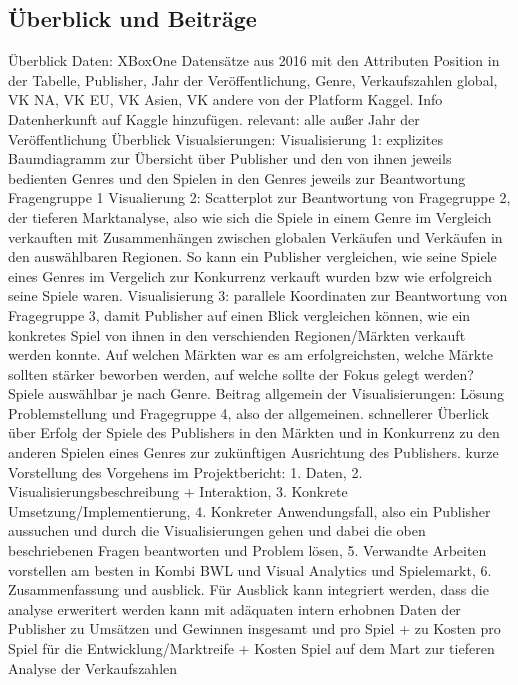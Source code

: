 \documentclass[usegeometry=true]{scrartcl}
\begin{document}
\subsection{Überblick und Beiträge}
Überblick Daten: XBoxOne Datensätze aus 2016 mit den Attributen Position in der Tabelle, Publisher, Jahr der Veröffentlichung, Genre, Verkaufszahlen global, VK NA, VK EU, VK Asien, VK andere von der Platform Kaggel. Info Datenherkunft auf Kaggle hinzufügen. relevant: alle außer Jahr der Veröffentlichung
Überblick Visualsierungen:  
Visualisierung 1: explizites Baumdiagramm zur Übersicht über Publisher und den von ihnen jeweils bedienten Genres und den Spielen in den Genres jeweils zur Beantwortung Fragengruppe 1
Visualierung 2: Scatterplot zur Beantwortung von Fragegruppe 2, der tieferen Marktanalyse, also wie sich die Spiele in einem Genre im Vergleich verkauften mit Zusammenhängen zwischen globalen Verkäufen und Verkäufen in den auswählbaren Regionen. So kann ein Publisher vergleichen, wie seine Spiele eines Genres im Vergelich zur Konkurrenz verkauft wurden bzw wie erfolgreich seine Spiele waren.
Visualisierung 3: parallele Koordinaten zur Beantwortung von Fragegruppe 3, damit Publisher auf einen Blick vergleichen können, wie ein konkretes Spiel von ihnen in den verschienden Regionen/Märkten verkauft werden konnte. Auf welchen Märkten war es am erfolgreichsten, welche Märkte sollten stärker beworben werden, auf welche sollte der Fokus gelegt werden? Spiele auswählbar je nach Genre.
Beitrag allgemein der Visualisierungen: Lösung Problemstellung und Fragegruppe 4, also der allgemeinen. schnellerer Überlick über Erfolg der Spiele des Publishers in den Märkten und in Konkurrenz zu den anderen Spielen eines Genres zur zukünftigen Ausrichtung des Publishers.
kurze Vorstellung des Vorgehens im Projektbericht: 1. Daten, 2. Visualisierungsbeschreibung + Interaktion, 3. Konkrete Umsetzung/Implementierung, 4. Konkreter Anwendungsfall, also ein Publisher aussuchen und durch die Visualisierungen gehen und dabei die oben beschriebenen Fragen beantworten und Problem lösen, 5. Verwandte Arbeiten vorstellen am besten in Kombi BWL und Visual Analytics und Spielemarkt, 6. Zusammenfassung und ausblick. Für Ausblick kann integriert werden, dass die analyse erweritert werden kann mit adäquaten intern erhobnen Daten der Publisher zu Umsätzen und Gewinnen insgesamt und pro Spiel + zu Kosten pro Spiel für die Entwicklung/Marktreife + Kosten Spiel auf dem Mart zur tieferen Analyse der Verkaufszahlen


\end{document}
